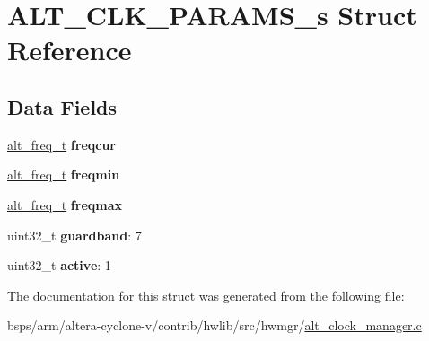 \hypertarget{structALT__CLK__PARAMS__s}{}\section{A\+L\+T\+\_\+\+C\+L\+K\+\_\+\+P\+A\+R\+A\+M\+S\+\_\+s Struct Reference}
\label{structALT__CLK__PARAMS__s}
\subsection*{Data Fields}
\begin{DoxyCompactItemize}
\item 
\mbox{\label{structALT__CLK__PARAMS__s_a142cf45a277785740a28aebd8dc1a07a}} 
\mbox{\hyperlink{group__CLK__MGR_gaa32fe6dfaa6def16098e0039eb336383}{alt\+\_\+freq\+\_\+t}} {\bfseries freqcur}
\item 
\mbox{\label{structALT__CLK__PARAMS__s_aed85674f30da7502f3cdc1047ad52f68}} 
\mbox{\hyperlink{group__CLK__MGR_gaa32fe6dfaa6def16098e0039eb336383}{alt\+\_\+freq\+\_\+t}} {\bfseries freqmin}
\item 
\mbox{\label{structALT__CLK__PARAMS__s_a59b35489e9e1bfe223d22fe7b4d190ed}} 
\mbox{\hyperlink{group__CLK__MGR_gaa32fe6dfaa6def16098e0039eb336383}{alt\+\_\+freq\+\_\+t}} {\bfseries freqmax}
\item 
\mbox{\label{structALT__CLK__PARAMS__s_add53c2f30197f436d6ea3071b51fd6a8}} 
uint32\+\_\+t {\bfseries guardband}\+: 7
\item 
\mbox{\label{structALT__CLK__PARAMS__s_abf0ee27714b141ddc71be1fbb7e6a284}} 
uint32\+\_\+t {\bfseries active}\+: 1
\end{DoxyCompactItemize}


The documentation for this struct was generated from the following file\+:\begin{DoxyCompactItemize}
\item 
bsps/arm/altera-\/cyclone-\/v/contrib/hwlib/src/hwmgr/\mbox{\hyperlink{alt__clock__manager_8c}{alt\+\_\+clock\+\_\+manager.\+c}}\end{DoxyCompactItemize}
